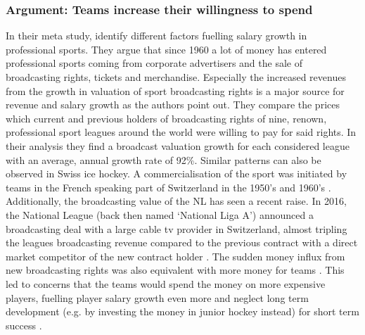 \documentclass[12pt,a4paper]{article}\usepackage[]{graphicx}\usepackage[]{xcolor}
\begin{document}
\subsubsection{Argument: Teams increase their willingness to spend}

In their meta study, \citet{andon_accounting_2019} identify different factors fuelling salary growth in professional sports. They argue that since 1960 a lot of money has entered professional sports coming from corporate advertisers and the sale of broadcasting rights, tickets and merchandise. Especially the increased revenues from the growth in valuation of sport broadcasting rights is a major source for revenue and salary growth as the authors point out. They compare the prices which current and previous holders of broadcasting rights of nine, renown, professional sport leagues around the world were willing to pay for said rights. In their analysis they find a broadcast valuation growth for each considered league with an average, annual growth rate of 92\%. Similar patterns can also be observed in Swiss ice hockey. A commercialisation of the sport was initiated by teams in the French speaking part of Switzerland in the 1950’s and 1960’s \citep{ koller_kanadier_2016}. Additionally, the broadcasting value of the NL has seen a recent raise. In 2016, the National League (back then named ‘National Liga A’) announced a broadcasting deal with a large cable tv provider in Switzerland, almost tripling the leagues broadcasting revenue compared to the previous contract with a direct market competitor of the new contract holder \citep[see][]{germann_354_2016}. The sudden money influx from new broadcasting rights was also equivalent with more money for teams \citep[see][]{noauthor_noch_2017}. This led to concerns that the teams would spend the money on more expensive players, fuelling player salary growth even more and neglect long term development (e.g. by investing the money in junior hockey instead) for short term success \citep[see][]{germann_schweizer_2018, kuchta_schone_2017}. 
\end{document}
